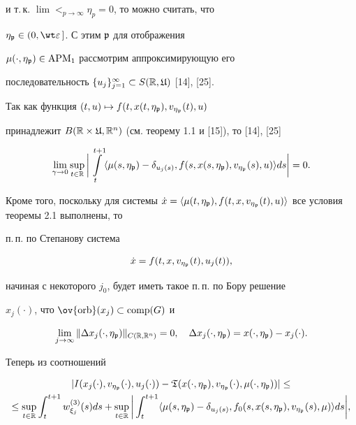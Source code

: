 и т.\,к. $\lim\lt_{p\to\infty} \eta_p=0$, то можно считать, что


$\eta_{\ggp}\in(0,\wt\ve\,]$. С этим ${\frak p}$ для отображения


$\mu(\cdot,\eta_{{\frak p}})\in\operatorname{APM}_1$ рассмотрим аппроксимирующую его


последовательность $\{u_j\}_{j=1}^{\infty}\subset S(\Bbb R,\frak U)$ [14], [25].


Так как функция $(t,u)\mapsto f(t,x(t,\eta_{{\frak p}}), v_{\eta_{{\frak p}}}(t),u)$


принадлежит $B(\Bbb R\times\frak U,\Bbb R^n)$ (см. теорему 1.1 и [15]), то [14], [25]


\begin{equation}


\lim_{\gamma\to 0}\sup_{t\in\R}\bigg|\int\lt_{t}^{t+1}


\la \mu(s,\eta_{\ggp})-\delta_{u_j(s)},


f(s,x(s,\eta_{\ggp}), v_{\eta_{\ggp}}(s),u)\ra ds\bigg|=0.


\end{equation}


Кроме того, поскольку для системы $\dot x=\la \mu(t,\eta_{\ggp}),


f(t,x,v_{\eta_{\ggp}}(t),u)\ra$ все условия теоремы 2.1 выполнены, то


п.\,п. по Степанову система


$$


\Dot x=f(t,x,v_{\eta_{\ggp}}(t), u_j(t)),


$$


начиная с некоторого $j_0$, будет иметь такое п.\,п. по Бору решение


$x_j(\cdot)$, что $\ov{\orb}(x_j)\subset\comp(G)$ и


\begin{equation}


\lim_{j\to\infty}\|\Dl x_j(\cdot,\eta_{\ggp})\|_{C(\R,\R^n)}=0, \quad


\Dl x_j(\cdot,\eta_{\ggp})= x(\cdot,\eta_{\ggp})-x_j(\cdot).


\end{equation}


Теперь из соотношений


\begin{multline*}


|I(x_{j}(\cdot),v_{\eta_{\ggp}}(\cdot),u_{j}(\cdot))-


\gT(x(\cdot,\eta_{\ggp}),v_{\eta_{\ggp}}(\cdot),\mu(\cdot,\eta_{\ggp}))|\le\\


\le\sup_{t\in\R}\int_{t}^{t+1}w_{\xi_{j}}^{(3)}(s)ds+


\sup_{t\in\R}\bigg|\int_{t}^{t+1}\la\mu(s,\eta_{\ggp})-\delta_{u_{j}(s)},


f_0(s,x(s,\eta_{\ggp}),v_{\eta_{\ggp}}(s),\mu)\ra ds\bigg|,


\end{multline*}


